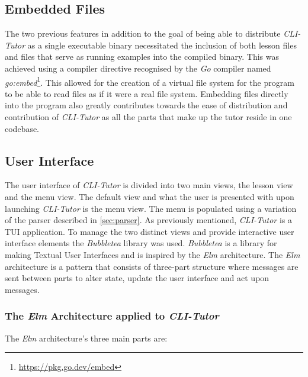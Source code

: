  
\subsection{Embedded Files}

The two previous features in addition to the goal of being able to distribute
\textit{CLI-Tutor} as a single executable binary necessitated the inclusion of
both lesson files and files that serve as running examples into the compiled
binary. This was achieved using a compiler directive recognised by the \textit{Go}
compiler named \textit{go:embed}\footnote{\url{https://pkg.go.dev/embed}}. This
allowed for the creation of a virtual file system for the program to be able to
read files as if it were a real file system. Embedding files directly into
the program also greatly contributes towards the ease of distribution and
contribution of \textit{CLI-Tutor} as all the parts that make up the tutor reside
in one codebase.

\subsection{User Interface}

The user interface of \textit{CLI-Tutor} is divided into two main views, the
lesson view and the menu view. The default view and what the user is presented with
upon launching \textit{CLI-Tutor} is the menu view. The menu is populated using
a variation of the parser described in \autoref{sec:parser}. As previously
mentioned, \textit{CLI-Tutor} is a TUI application. To manage the two distinct
views and provide interactive user interface elements the \textit{Bubbletea}
library was used. \textit{Bubbletea} is a library for making Textual User
Interfaces and is inspired by the \textit{Elm} architecture. The \textit{Elm}
architecture is a pattern that consists of three-part structure where messages
are sent between parts to alter state, update the user interface and act upon
messages.

\subsubsection{The \textit{Elm} Architecture applied to \textit{CLI-Tutor}} 

The \textit{Elm} architecture's three main parts are:

